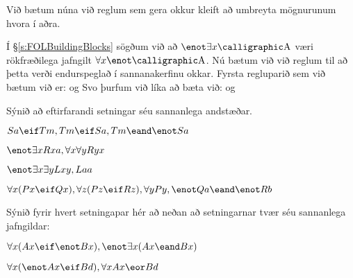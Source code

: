 Við bætum núna við reglum sem gera okkur kleift að umbreyta mögnurunum hvora í aðra.

Í \S\ref{s:FOLBuildingBlocks} sögðum við að $\enot\exists x\meta{A}$ væri rökfræðilega jafngilt $\forall x \enot\meta{A}$. Nú bætum við við reglum til að þetta verði endurspeglað í sannanakerfinu okkar. Fyrsta regluparið sem við bætum við er:
og
Svo þurfum við líka að bæta við:
og

\practiceproblems

\problempart
Sýnið að eftirfarandi setningar séu sannanlega andstæðar.
\begin{earg}
\item $Sa\eif Tm, Tm \eif Sa, Tm \eand \enot Sa$
\item $\enot\exists x Rxa, \forall x \forall y Ryx$
\item $\enot\exists x \exists y Lxy, Laa$
\item $\forall x(Px \eif Qx), \forall z(Pz \eif Rz), \forall y Py, \enot Qa \eand \enot Rb$
\end{earg}

\problempart
Sýnið fyrir hvert setningapar hér að neðan að setningarnar tvær séu sannanlega jafngildar:

\begin{earg}
\item $\forall x (Ax\eif \enot Bx), \enot\exists x(Ax \eand Bx)$
\item $\forall x (\enot Ax\eif Bd), \forall x Ax \eor Bd$
\end{earg}

